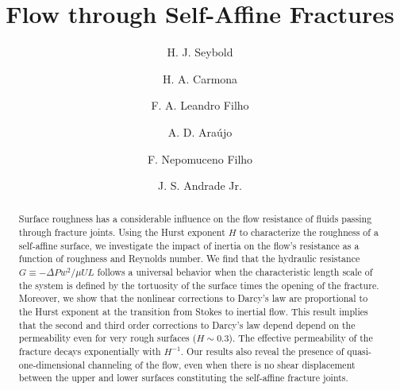 \documentclass[aps,pre,
superscriptaddress,
twocolumn,
notitlepage,
10pt,
]{revtex4-1}
\begin{document}
 

\title{Flow through Self-Affine Fractures}

\author{H. J. Seybold} %

\author{H. A. Carmona} %

\author{F. A. Leandro Filho} %




\author{A. D. Ara\'ujo} %

\author{F. Nepomuceno Filho}

\author{J. S. Andrade Jr.} 

\begin{abstract} 
	Surface roughness has a considerable influence on the flow resistance of fluids
passing through fracture joints. Using the Hurst exponent $H$ to characterize
the roughness of a self-affine surface, we investigate the impact of inertia on
the flow's resistance as a function of roughness and Reynolds number. We find
that the hydraulic resistance $G\equiv -\Delta P w^{2}/\mu U L$ follows a
universal behavior when the characteristic length scale of the system is
defined by the tortuosity of the surface times the opening of the fracture.
Moreover, we show that the nonlinear corrections to Darcy's law are
proportional to the Hurst exponent at the transition from Stokes to inertial
flow. This result implies that the second and third order corrections to
Darcy's law depend  depend on the permeability even for very rough surfaces ($H
\sim 0.3$). The effective permeability of the fracture decays exponentially
with $H^{-1}$. Our results also reveal the presence of quasi-one-dimensional
channeling of the flow, even when there is no shear displacement between the
upper and lower surfaces constituting the self-affine fracture joints.
\end{abstract}
\end{document}
